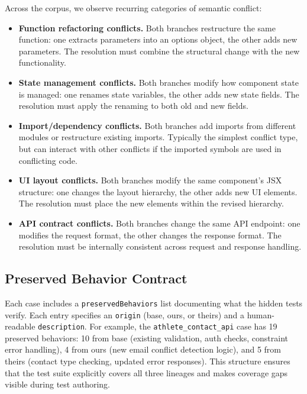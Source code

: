 \documentclass[11pt,a4paper]{article}
\begin{document}
Across the corpus, we observe recurring categories of semantic conflict:

\begin{itemize}[leftmargin=2em]
\item \textbf{Function refactoring conflicts.} Both branches restructure the same function: one extracts parameters into an options object, the other adds new parameters. The resolution must combine the structural change with the new functionality.

\item \textbf{State management conflicts.} Both branches modify how component state is managed: one renames state variables, the other adds new state fields. The resolution must apply the renaming to both old and new fields.

\item \textbf{Import/dependency conflicts.} Both branches add imports from different modules or restructure existing imports. Typically the simplest conflict type, but can interact with other conflicts if the imported symbols are used in conflicting code.

\item \textbf{UI layout conflicts.} Both branches modify the same component's JSX structure: one changes the layout hierarchy, the other adds new UI elements. The resolution must place the new elements within the revised hierarchy.

\item \textbf{API contract conflicts.} Both branches change the same API endpoint: one modifies the request format, the other changes the response format. The resolution must be internally consistent across request and response handling.
\end{itemize}

\subsection{Preserved Behavior Contract}

Each case includes a \texttt{preservedBehaviors} list documenting what the hidden tests verify. Each entry specifies an \texttt{origin} (base, ours, or theirs) and a human-readable \texttt{description}. For example, the \texttt{athlete\_contact\_api} case has 19 preserved behaviors: 10 from base (existing validation, auth checks, constraint error handling), 4 from ours (new email conflict detection logic), and 5 from theirs (contact type checking, updated error responses). This structure ensures that the test suite explicitly covers all three lineages and makes coverage gaps visible during test authoring.
\end{document}
